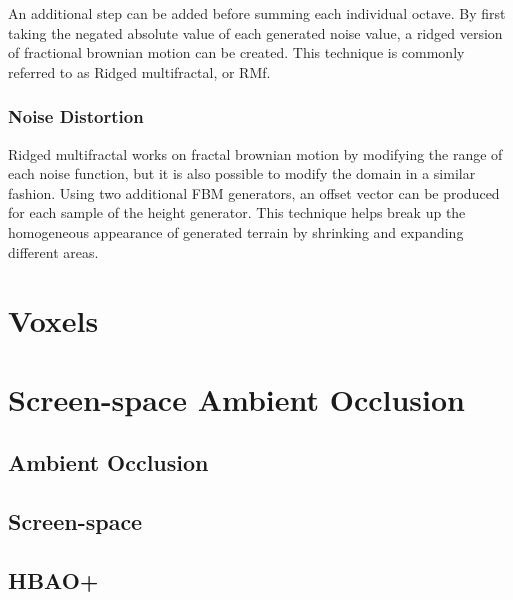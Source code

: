 An additional step can be added before summing each individual octave.
By first taking the negated absolute value of each generated noise value, a ridged version of fractional brownian motion can be created.
This technique is commonly referred to as Ridged multifractal, or RMf.

\subsubsection{Noise Distortion}

Ridged multifractal works on fractal brownian motion by modifying the range of each noise function, but it is also possible to modify the domain in a similar fashion.
Using two additional FBM generators, an offset vector can be produced for each sample of the height generator.
This technique helps break up the homogeneous appearance of generated terrain by shrinking and expanding different areas.


\section{Voxels}


\section{Screen-space Ambient Occlusion}

\subsection{Ambient Occlusion}

\subsection{Screen-space}

\subsection{HBAO+}

